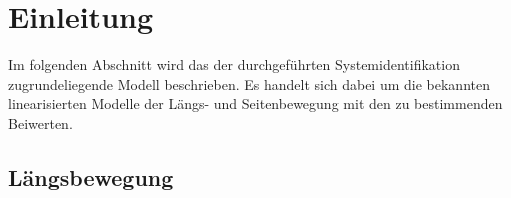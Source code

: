 \chapter{Einleitung}

Im folgenden Abschnitt wird das der durchgeführten Systemidentifikation zugrundeliegende Modell beschrieben. Es handelt sich 
dabei um die bekannten linearisierten Modelle der Längs- und Seitenbewegung \cite{Fichter2009} mit den zu bestimmenden 
Beiwerten.

\section{Längsbewegung}
